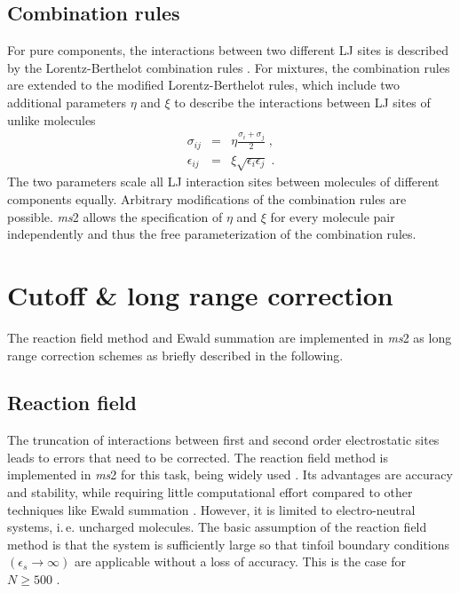 %
%


\subsection{Combination rules}
\label{sec:Mixing rules}

For pure components, the interactions between two different LJ sites is described by the Lorentz-Berthelot
combination rules \parencite{berthelot, lorentz}. For mixtures, the combination rules are extended to the modified Lorentz-Berthelot rules, which include two additional parameters $\eta$ and $\xi$ to describe the interactions between LJ sites of unlike molecules \parencite{fischer}
\begin{eqnarray}
\sigma_{ij} &=& \eta\frac{\sigma_{i}+\sigma_{j}}{2} \;, \\
\epsilon_{ij} &=& \xi\sqrt{\epsilon_{i}\epsilon_{j}} \;.
\end{eqnarray}
The two parameters scale all LJ interaction sites between molecules of different components equally. Arbitrary
modifications of the combination rules are possible. \textit{ms}2 allows the specification of $\eta$ and $\xi$ for every molecule pair independently and thus the free parameterization of the combination rules.


\section{Cutoff \& long range correction}
\label{sec:Cutoff long range correction}

The reaction field method and Ewald summation are implemented in \textit{ms}2 as long range correction schemes as briefly described in the following.

\subsection{Reaction field}
\label{sec:Reaction Field}


The truncation of interactions between first and second order electrostatic sites leads to errors that need to be corrected. The reaction field method \parencite{Frenkel, nymand} is implemented in \textit{ms}2 for this task, being widely used \parencite{steinhauser, vanderSpoel}. Its advantages are accuracy and stability, while requiring little computational effort compared to other techniques like Ewald summation \parencite{ewald}. However, it is limited to electro-neutral systems, i.\,e. uncharged molecules. The basic assumption of the reaction field method is that the system is sufficiently large so that tinfoil boundary conditions $\left(\epsilon_{s} \rightarrow \infty\right)$ are applicable without a loss of accuracy. This is the case for $N\geq 500$ \parencite{lisal, garzon, lisal1, jedlovszky}.

